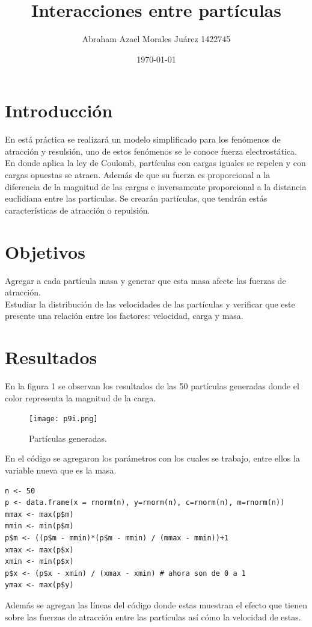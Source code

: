 \documentclass{article}
\author{Abraham Azael Morales Juárez  1422745}
\title{Interacciones entre partículas}
\date{\today}
\begin{document}
\maketitle

\section{Introducción}
En está práctica se realizará un modelo simplificado para los fenómenos de atracción y resulsión, uno de estos fenómenos se le conoce fuerza electrostática\cite{REF1}. En donde aplica la ley de Coulomb, partículas con cargas iguales se repelen y con cargas opuestas se atraen. Además de que su fuerza es proporcional a la diferencia de la magnitud de las cargas e inversamente proporcional a la distancia euclidiana entre las partículas. Se crearán partículas, que tendrán estás características de atracción o repulsión\cite{REF2}.
\section{Objetivos}
Agregar a cada partícula masa y generar que esta masa afecte las fuerzas de atracción.\\
Estudiar la distribución de las velocidades de las partículas y verificar que este presente una relación entre los factores: velocidad, carga y masa.

\section{Resultados}
En la figura 1 se observan los resultados de las 50 partículas generadas donde el color representa la magnitud de la carga. 
\begin{figure}[H]
\centering
\texttt{[image: p9i.png]}
\caption{Partículas generadas.}
\end{figure}
En el código se agregaron los parámetros con los cuales se trabajo, entre ellos la variable nueva que es la masa.
\begin{lstlisting}[frame=single]
n <- 50
p <- data.frame(x = rnorm(n), y=rnorm(n), c=rnorm(n), m=rnorm(n))
mmax <- max(p$m)
mmin <- min(p$m)
p$m <- ((p$m - mmin)*(p$m - mmin) / (mmax - mmin))+1 
xmax <- max(p$x)
xmin <- min(p$x)
p$x <- (p$x - xmin) / (xmax - xmin) # ahora son de 0 a 1
ymax <- max(p$y)
\end{lstlisting}
Además se agregan las líneas del código donde estas muestran el efecto que tienen sobre las fuerzas de atracción entre las partículas así cómo la velocidad de estas.
\end{document}
